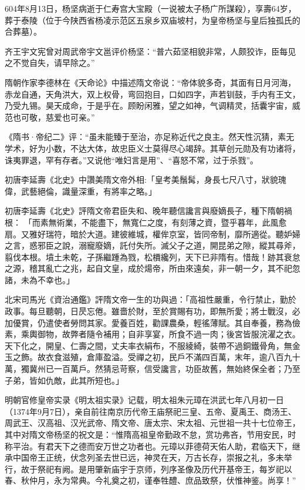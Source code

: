 604年8月13日，杨坚病逝于仁寿宫大宝殿（一说被太子杨广所謀殺），享壽64岁，葬于泰陵（位于今陕西省杨凌示范区五泉乡双庙坡村，为皇帝杨坚与皇后独孤氏的合葬墓）。

齐王宇文宪曾对周武帝宇文邕评价杨坚：“普六茹坚相貌非常，人颇狡诈，臣每见之不觉自失，请早除之。”

隋朝作家李德林在《天命论》中描述隋文帝说：“帝体貌多奇，其面有日月河海，赤龙自通，天角洪大，双上权骨，弯回抱目，口如四字，声若钏鼓，手内有王文，乃受九锡。昊天成命，于是乎在。顾盼闲雅，望之如神，气调精灵，括囊宇宙，威范也可敬，慈爱也可亲。”

《隋书·帝纪二》评：“虽未能臻于至治，亦足称近代之良主。然天性沉猜，素无学术，好为小数，不达大体，故忠臣义士莫得尽心竭辞。其草创元勋及有功诸将，诛夷罪退，罕有存者。”又说他“唯妇言是用”、“喜怒不常，过于杀戮”。

初唐李延壽《北史》中讚美隋文帝外相:「皇考美鬚髯，身長七尺八寸，狀貌瑰偉，武藝絕倫，識量深重，有將率之略。」

初唐李延壽《北史》評隋文帝君臣失和、晚年聽信讒言與廢嫡長子，種下隋朝禍根： 「而素無術業，不能盡下，無寬仁之度，有刻薄之資，暨乎暮年，此風愈扇。又雅好瑞符，暗於大道。建彼維城，權侔京室，皆同帝制，靡所適從。聽妒婦之言，惑邪臣之說，溺寵廢嫡，託付失所。滅父子之道，開昆弟之隙，縱其尋斧，翦伐本根。墳土未乾，子孫繼踵為戮，松檟纔列，天下已非隋有。惜哉！跡其衰怠之源，稽其亂亡之兆，起自文皇，成於煬帝，所由來遠矣，非一朝一夕，其不祀忽諸，未為不幸也。」

北宋司馬光《資治通鑑》評隋文帝一生的功與過：「高祖性嚴重，令行禁止，勤於政事。每旦聽朝，日昃忘倦。雖嗇於財，至於賞賜有功，即無所愛；將士戰沒，必加優賞，仍遣使者勞問其家。愛養百姓，勸課農桑，輕徭薄賦。其自奉養，務為儉素，乘輿御物，故弊者隨令補用；自非享宴，所食不過一肉；後宮皆服浣濯之衣。天下化之，開皇、仁壽之間，丈夫率衣絹布，不服綾綺，裝帶不過銅鐵骨角，無金玉之飾。故衣食滋殖，倉庫盈溢。受禪之初，民戶不滿四百萬，末年，逾八百九十萬，獨冀州已一百萬戶。然猜忌苛察，信受讒言，功臣故舊，無始終保全者；乃至子弟，皆如仇敵，此其所短也。」

明朝官修皇帝实录《明太祖实录》记载，明太祖朱元璋在洪武七年八月初一日（1374年9月7日），亲自前往南京历代帝王庙祭祀三皇、五帝、夏禹王、商汤王、周武王、汉高祖、汉光武帝、隋文帝、唐太宗、宋太祖、元世祖一共十七位帝王，其中对隋文帝杨坚的祝文是：“惟隋高祖皇帝勤政不怠，赏功弗吝，节用安民，时称平治。有君天下之德而安万世之功者也。元璋以菲德荷天佑人助，君临天下，继承中国帝王正统，伏念列圣去世已远，神灵在天，万古长存，崇报之礼，多未举行，故于祭祀有阙。是用肇新庙宇于京师，列序圣像及历代开基帝王，每岁祀以春、秋仲月，永为常典。今礼奠之初，谨奉牲醴、庶品致祭，伏惟神鉴。尚享！”

